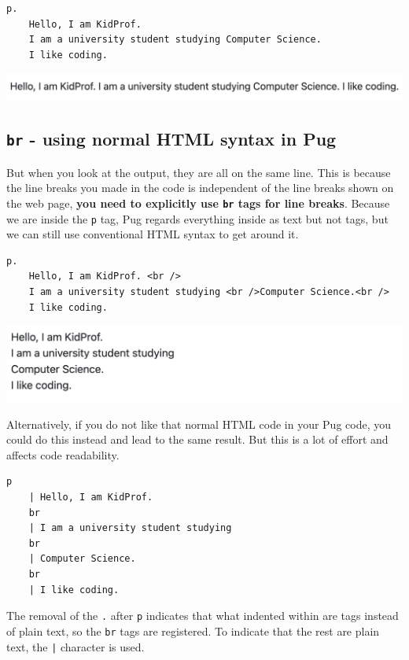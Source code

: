 \begin{lstlisting}[language=pug]
p.
	Hello, I am KidProf.
	I am a university student studying Computer Science.
	I like coding.
\end{lstlisting}

\includegraphics[width=15cm]{images/ch5-textinaline.png}

\subsection*{\texttt{br} - using normal HTML syntax in Pug}
\label{sec:br}

But when you look at the output, they are all on the same line. This is because the line breaks you made in the code is independent of the line breaks shown on the web page, \textbf{you need to explicitly use \texttt{br} tags for line breaks}. Because we are inside the \texttt{p} tag, Pug regards everything inside as text but not tags, but we can still use conventional HTML syntax to get around it.

\begin{lstlisting}[language=pug]
p.
	Hello, I am KidProf. <br />
	I am a university student studying <br />Computer Science.<br />
	I like coding.
\end{lstlisting}

\includegraphics[width=15cm]{images/ch5-textmultiplelines.png}

Alternatively, if you do not like that normal HTML code in your Pug code, you could do this instead and lead to the same result. But this is a lot of effort and affects code readability.

\begin{lstlisting}[language=pug]
p
	| Hello, I am KidProf.
	br
	| I am a university student studying
	br
	| Computer Science.
	br
	| I like coding.
\end{lstlisting}

The removal of the \texttt{.} after \texttt{p} indicates that what indented within are tags instead of plain text, so the \texttt{br} tags are registered. To indicate that the rest are plain text, the \texttt{|} character is used.

